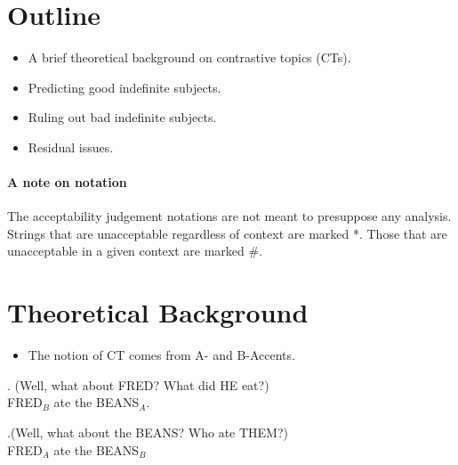\documentclass[letterpaper]{article}
\begin{document}
\section{Outline}
\begin{itemize}
  \item A brief theoretical background on contrastive topics (CTs).
  \item Predicting good indefinite subjects.
  \item Ruling out bad indefinite subjects.
  \item Residual issues.
\end{itemize}
\paragraph{A note on notation}
The acceptability judgement notations are not meant to presuppose any analysis.
Strings that are unacceptable regardless of context are marked *.
Those that are unacceptable in a given context are marked \#.
\section{Theoretical Background}
\begin{itemize}
  \item The notion of CT comes from  A- and B-Accents.
\end{itemize}
\ex. (Well, what about FRED? What did HE eat?)\\
FRED$_B$ ate the BEANS$_A$.

\ex.(Well, what about the BEANS? Who ate THEM?)\\
FRED$_A$ ate the BEANS$_B$
\end{document}
